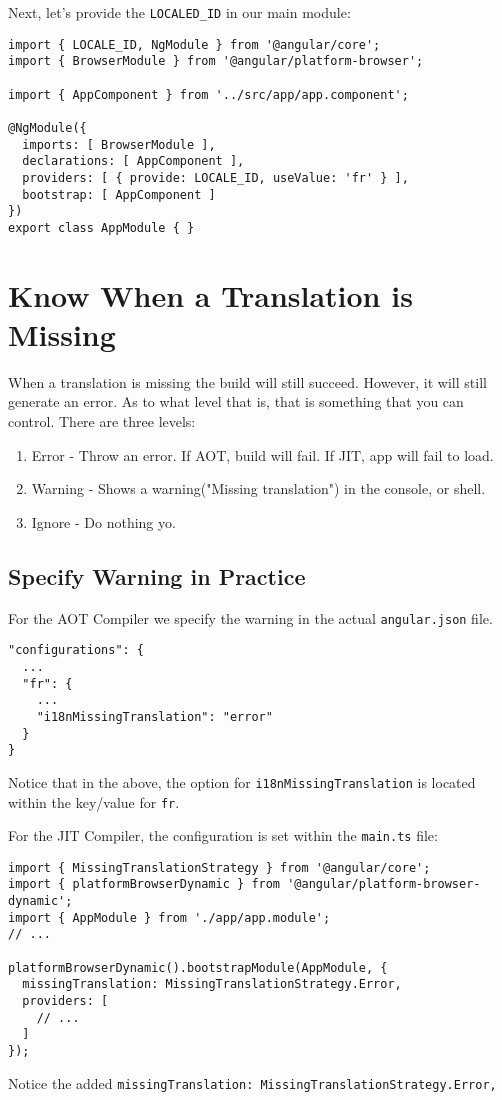 Next, let's provide the \lstinline{LOCALED_ID} in our main module: 
\begin{lstlisting}[caption=app.module.ts]
import { LOCALE_ID, NgModule } from '@angular/core';
import { BrowserModule } from '@angular/platform-browser';

import { AppComponent } from '../src/app/app.component';

@NgModule({
  imports: [ BrowserModule ],
  declarations: [ AppComponent ],
  providers: [ { provide: LOCALE_ID, useValue: 'fr' } ],
  bootstrap: [ AppComponent ]
})
export class AppModule { }  
\end{lstlisting}

\section{Know When a Translation is Missing}
When a translation is missing the build will still succeed. However, it will still generate an error. As to what level that is, that is something that you can control. There are three levels: 
\begin{enumerate}
  \item Error - Throw an error. If AOT, build will fail. If JIT, app will fail 
  to load. 
  \item Warning - Shows a warning("Missing translation") in the console, or 
  shell.
  \item Ignore - Do nothing yo. 
\end{enumerate}

\subsection{Specify Warning in Practice}
For the AOT Compiler we specify the warning in the actual
\lstinline{angular.json} file. 
\begin{lstlisting}[caption=angular.json]
"configurations": {
  ...
  "fr": {
    ...
    "i18nMissingTranslation": "error"
  }
}  
\end{lstlisting}

Notice that in the above, the option for \lstinline{i18nMissingTranslation} is
located within the key/value for \lstinline{fr}.

For the JIT Compiler, the configuration is set within the \lstinline{main.ts}
file: 
\begin{lstlisting}[caption=src/main.ts]
import { MissingTranslationStrategy } from '@angular/core';
import { platformBrowserDynamic } from '@angular/platform-browser-dynamic';
import { AppModule } from './app/app.module';
// ...

platformBrowserDynamic().bootstrapModule(AppModule, {
  missingTranslation: MissingTranslationStrategy.Error,
  providers: [
    // ...
  ]
});
\end{lstlisting}
Notice the added \lstinline{missingTranslation: MissingTranslationStrategy.Error,}

